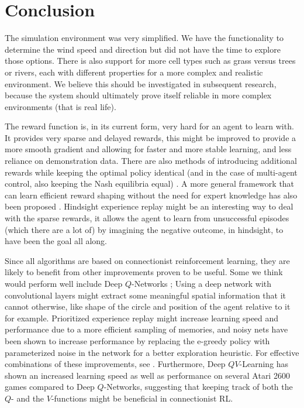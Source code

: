 
\section{Conclusion}\label{sec:conclusions}
The simulation environment was very simplified. We have the functionality to determine the wind speed and direction but did not have the time to explore those options. There is also support for more cell types such as grass versus trees or rivers, each with different properties for a more complex and realistic environment. We believe this should be investigated in subsequent research, because the system should ultimately prove itself reliable in more complex environments (that is real life).

The reward function is, in its current form, very hard for an agent to learn with. It provides very sparse and delayed rewards, this might be improved to provide a more smooth gradient and allowing for faster and more stable learning, and less reliance on demonstration data. There are also methods of introducing additional rewards while keeping the optimal policy identical (and in the case of multi-agent control, also keeping the Nash equilibria equal) \citep{ng1999policy}. A more general framework that can learn efficient reward shaping without the need for expert knowledge has also been proposed \citep{zou2019reward}. Hindsight experience replay \citep{andrychowicz2017hindsight} might be an interesting way to deal with the sparse rewards, it allows the agent to learn from unsuccessful episodes (which there are a lot of) by imagining the negative outcome, in hindsight, to have been the goal all along.

Since all algorithms are based on connectionist reinforcement learning, they are likely to benefit from other improvements proven to be useful. Some we think would perform well include Deep $Q$-Networks \citep{mnih2015human}; Using a deep network with convolutional layers might extract some meaningful spatial information that it cannot otherwise, like shape of the circle and position of the agent relative to it for example. Prioritized experience replay \citep{schaul2015prioritized} might increase learning speed and performance due to a more efficient sampling of memories, and noisy nets \citep{fortunato2017noisy} have been shown to increase performance by replacing the e-greedy policy with parameterized noise in the network for a better exploration heuristic. For effective combinations of these improvements, see \citep{hessel2018rainbow}. Furthermore, Deep $QV$-Learning \citep{sabatelli2018deep} has shown an increased learning speed as well as performance on several Atari 2600 games compared to Deep $Q$-Networks, suggesting that keeping track of both the $Q$- and the $V$-functions might be beneficial in connectionist RL.

